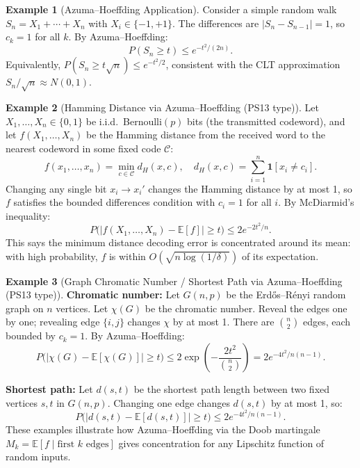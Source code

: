 \documentclass[12pt, a4paper]{article}
\theoremstyle{definition}
\newtheorem{example}{Example}[section]
\theoremstyle{plain}
\newcommand{\EE}{\mathbb{E}}
\begin{document}
\begin{example}[Azuma--Hoeffding Application]
Consider a simple random walk $S_n = X_1 + \cdots + X_n$ with $X_i \in \{-1, +1\}$. The differences are $|S_n - S_{n-1}| = 1$, so $c_k = 1$ for all $k$. By Azuma--Hoeffding:
\[
  P(S_n \geq t) \leq e^{-t^2/(2n)}.
\]
Equivalently, $P(S_n \geq t\sqrt{n}) \leq e^{-t^2/2}$, consistent with the CLT approximation $S_n / \sqrt{n} \approx N(0,1)$.
\end{example}

\begin{example}[Hamming Distance via Azuma--Hoeffding (PS13 type)]
Let $X_1, \ldots, X_n \in \{0,1\}$ be i.i.d.\ Bernoulli$(p)$ bits (the transmitted codeword), and let $f(X_1,\ldots,X_n)$ be the Hamming distance from the received word to the nearest codeword in some fixed code $\mathcal{C}$:
\[
  f(x_1,\ldots,x_n) = \min_{c \in \mathcal{C}} d_H(x, c), \quad d_H(x,c) = \sum_{i=1}^n \mathbf{1}[x_i \neq c_i].
\]
Changing any single bit $x_i \to x_i'$ changes the Hamming distance by at most 1, so $f$ satisfies the bounded differences condition with $c_i = 1$ for all $i$. By McDiarmid's inequality:
\[
  P\bigl(|f(X_1,\ldots,X_n) - \EE[f]| \geq t\bigr) \leq 2e^{-2t^2/n}.
\]
This says the minimum distance decoding error is concentrated around its mean: with high probability, $f$ is within $O(\sqrt{n \log(1/\delta)})$ of its expectation.
\end{example}

\begin{example}[Graph Chromatic Number / Shortest Path via Azuma--Hoeffding (PS13 type)]
\textbf{Chromatic number:} Let $G(n,p)$ be the Erd\H{o}s--R\'enyi random graph on $n$ vertices. Let $\chi(G)$ be the chromatic number. Reveal the edges one by one; revealing edge $\{i,j\}$ changes $\chi$ by at most 1. There are $\binom{n}{2}$ edges, each bounded by $c_k = 1$. By Azuma--Hoeffding:
\[
  P\bigl(|\chi(G) - \EE[\chi(G)]| \geq t\bigr) \leq 2\exp\!\left(-\frac{2t^2}{\binom{n}{2}}\right) = 2e^{-4t^2/n(n-1)}.
\]

\textbf{Shortest path:} Let $d(s,t)$ be the shortest path length between two fixed vertices $s,t$ in $G(n,p)$. Changing one edge changes $d(s,t)$ by at most 1, so:
\[
  P\bigl(|d(s,t) - \EE[d(s,t)]| \geq t\bigr) \leq 2e^{-4t^2/n(n-1)}.
\]
These examples illustrate how Azuma--Hoeffding via the Doob martingale $M_k = \EE[f \mid \text{first } k \text{ edges}]$ gives concentration for any Lipschitz function of random inputs.
\end{example}
\end{document}
